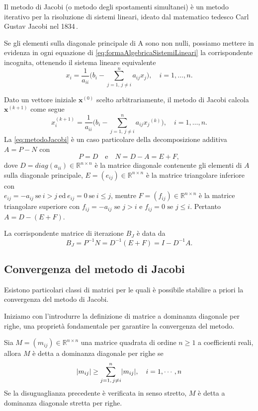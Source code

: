 Il metodo di Jacobi (o metodo degli spostamenti simultanei) \`e un metodo iterativo per la risoluzione di sistemi lineari, ideato dal matematico tedesco Carl Gustav Jacobi nel 1834\,\cite{JacobiMethod}.

Se gli elementi sulla diagonale principale di A sono non nulli, possiamo mettere in evidenza in ogni equazione di 
\eqref{eq:formaAlgebricaSistemiLineari} la corrispondente incognita, ottenendo il sistema lineare equivalente
\begin{equation}
    x_{i}=\frac{1}{a_{ii}}\Bigg(b_{i} - \sum_{j=1, \, j \neq i}^{n}a_{ij}x_{j}\Bigg),\quad i=1,\dots,n.
\end{equation}

Dato un vettore iniziale $\mathbf{x}^{(0)}$ scelto arbitrariamente, il metodo di Jacobi calcola $\mathbf{x}^{(k+1)}$ come segue
\begin{equation}
    \label{eq:metodoJacobi}
    x_{i}^{(k+1)}=\frac{1}{a_{ii}}\Bigg(b_{i} - \sum_{j=1, \, j \neq i}^{n}a_{ij}x{_j}^{(k)}\Bigg),\quad i=1,\dots,n.
\end{equation}
La \eqref{eq:metodoJacobi} \`e un caso particolare della decomposizione additiva $A = P-N$ con
\begin{equation*}
    P = D\quad \text{e}\quad N = D - A = E + F,
\end{equation*}
dove $D=diag(a_{ii})\in\mathbb{R}^{n\times n}$ \`e la matrice diagonale contenente gli elementi di $A$ sulla diagonale principale, 
$E=(e_{ij})\in\mathbb{R}^{n\times n}$ \`e la matrice triangolare inferiore con \\ $e_{ij}=-a_{ij} \ \text{se} \ i>j \ \text{ed}\ e_{ij}=0 \ \text{se} \ i\le j$, 
mentre $F=(f_{ij})\in\mathbb{R}^{n\times n}$ \`e la matrice triangolare superiore con $f_{ij}=-a_{ij} \text{ se } j>i$ e $f_{ij}=0 \text{ se } j\le i$.
Pertanto $A = D - (E + F)$.

La corrispondente matrice di iterazione $B_{J}$ \`e data da
\begin{equation}
    B_{J} = P^{-1}N = D^{-1}(E + F) = I - D^{-1}A.
\end{equation}
\subsection{Convergenza del metodo di Jacobi}
Esistono particolari classi di matrici per le quali \`e possibile stabilire a priori la convergenza del metodo di Jacobi.

Iniziamo con l'introdurre la definizione di matrice a dominanza diagonale per righe, una propriet\`a fondamentale per garantire la convergenza del metodo.
\begin{definizione}
    Sia $M = (m_{ij})\in\mathbb{R}^{n \times n}$ una matrice quadrata di ordine $n\ge 1$ a coefficienti reali, allora $M$ \`e detta a dominanza diagonale per righe se
    \[
    \lvert m_{ij}\rvert \ge \sum_{j=1,\, j \neq i}^{n}\lvert m_{ij}\rvert,\quad i = 1,\cdots,n
    \]
    Se la disuguaglianza precedente \`e verificata in senso stretto, $M$ \`e detta a dominanza diagonale stretta per righe. 
\end{definizione}

